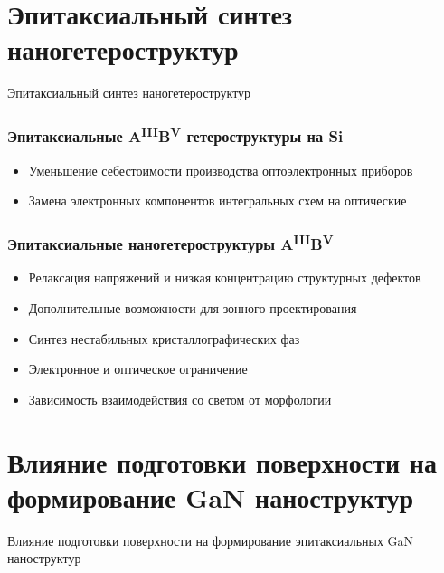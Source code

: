 \section{Эпитаксиальный синтез наногетероструктур}

\begin{frame}
	\begin{center}
		\Huge
		Эпитаксиальный синтез наногетероструктур
	\end{center}
\end{frame}

\begin{frame}
	\frametitle{Эпитаксиальные A\textsuperscript{III}B\textsuperscript{V} гетероструктуры на Si}
	\begin{itemize}
		\item Уменьшение себестоимости производства оптоэлектронных приборов
		\item Замена электронных компонентов интегральных схем на оптические
	\end{itemize}
\end{frame}

\begin{frame}
	\frametitle{Эпитаксиальные наногетероструктуры A\textsuperscript{III}B\textsuperscript{V}}
	\begin{itemize}
		\item Релаксация напряжений и низкая концентрацию структурных дефектов
		\item Дополнительные возможности для зонного проектирования
		\item Синтез нестабильных кристаллографических фаз
		\item Электронное и оптическое ограничение
		\item Зависимость взаимодействия со светом от морфологии
	\end{itemize}
\end{frame}

\section{Влияние подготовки поверхности на формирование GaN наноструктур}

\begin{frame}
	\begin{center}
		\Huge
		Влияние подготовки поверхности на формирование эпитаксиальных GaN наноструктур
	\end{center}
\end{frame}

